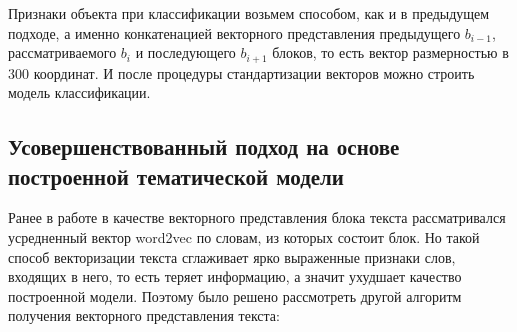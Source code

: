 \documentclass[12pt]{article}
\begin{document}
Признаки объекта при классификации возьмем способом, как и в предыдущем подходе, а именно конкатенацией векторного представления предыдущего $b_{i-1}$, рассматриваемого $b_i$ и последующего $b_{i+1}$ блоков, то есть вектор размерностью в 300 координат. И после процедуры стандартизации векторов можно строить модель классификации.

\subsection{Усовершенствованный подход на основе построенной тематической модели}
Ранее в работе в качестве векторного представления блока текста рассматривался усредненный вектор word2vec по словам, из которых состоит блок. Но такой способ векторизации текста сглаживает ярко выраженные признаки слов, входящих в него, то есть теряет информацию, а значит ухудшает качество построенной модели. Поэтому было решено рассмотреть другой алгоритм получения векторного представления текста:
\end{document}
